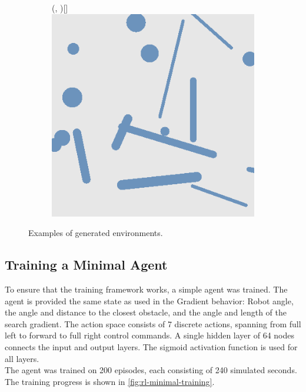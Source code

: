 \begin{figure}[H]
\begin{subfigure}{\w}
{        }
    \end{subfigure}
    \hspace*{\fill}
    \begin{subfigure}{\w}
        \makebox(\textwidth, \textwidth)[\textwidth]{
            \includegraphics[width=\linewidth]{figures/generated-worlds/world_5.png}
        }
    \end{subfigure}
    \caption{Examples of generated environments.}
    \label{fig:generated-enviornments}
\end{figure}

\subsection{Training a Minimal Agent}
To ensure that the training framework works, a simple agent was trained. The agent is provided the same state as used in the Gradient behavior: Robot angle, the angle and distance to the closest obstacle, and the angle and length of the search gradient. The action space consists of 7 discrete actions, spanning from full left to forward to full right control commands. A single hidden layer of 64 nodes connects the input and output layers. The sigmoid activation function is used for all layers. \\

The agent was trained on 200 episodes, each consisting of 240 simulated seconds. The training progress is shown in \cref{fig:rl-minimal-training}.


